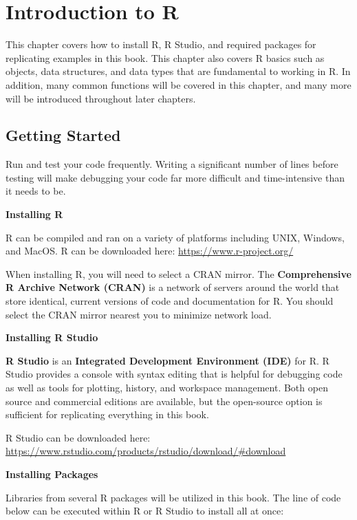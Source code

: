 \documentclass[
]{book}
\begin{document}
\hypertarget{r-intro}{%
\chapter{Introduction to R}\label{r-intro}}

This chapter covers how to install R, R Studio, and required packages for replicating examples in this book. This chapter also covers R basics such as objects, data structures, and data types that are fundamental to working in R. In addition, many common functions will be covered in this chapter, and many more will be introduced throughout later chapters.

\hypertarget{getting-started-1}{%
\section{Getting Started}\label{getting-started-1}}

Run and test your code frequently. Writing a significant number of lines before testing will make debugging your code far more difficult and time-intensive than it needs to be.

\textbf{Installing R}

R can be compiled and ran on a variety of platforms including UNIX, Windows, and MacOS. R can be downloaded here: \url{https://www.r-project.org/}

When installing R, you will need to select a CRAN mirror. The \textbf{Comprehensive R Archive Network (CRAN)} is a network of servers around the world that store identical, current versions of code and documentation for R. You should select the CRAN mirror nearest you to minimize network load.

\textbf{Installing R Studio}

\textbf{R Studio} is an \textbf{Integrated Development Environment (IDE)} for R. R Studio provides a console with syntax editing that is helpful for debugging code as well as tools for plotting, history, and workspace management. Both open source and commercial editions are available, but the open-source option is sufficient for replicating everything in this book.

R Studio can be downloaded here: \url{https://www.rstudio.com/products/rstudio/download/\#download}

\textbf{Installing Packages}

Libraries from several R packages will be utilized in this book. The line of code below can be executed within R or R Studio to install all at once:
\end{document}
